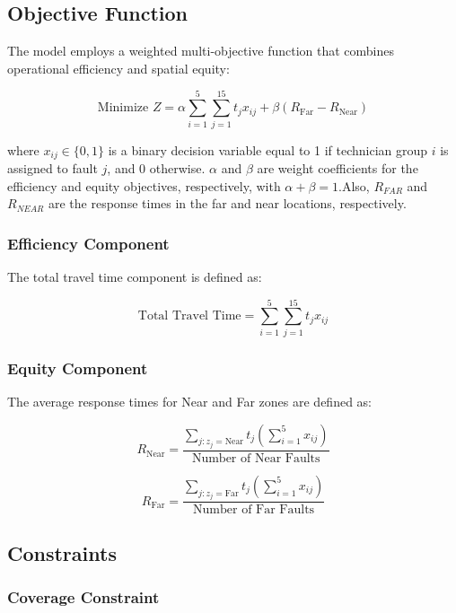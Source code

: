 \documentclass[11pt]{article}
\begin{document}
\subsection*{Objective Function}
The model employs a weighted multi-objective function that combines operational efficiency and spatial equity:

\begin{equation}
\text{Minimize } Z = \alpha \sum_{i=1}^{5} \sum_{j=1}^{15} t_j x_{ij} + \beta \left( R_{\text{Far}} - R_{\text{Near}} \right)
\end{equation}

where $x_{ij} \in \{0,1\}$ is a binary decision variable equal to 1 if technician group $i$ is assigned to fault $j$, and 0 otherwise. $\alpha$ and $\beta$ are weight coefficients for the efficiency and equity objectives, respectively, with $\alpha + \beta = 1$.Also, $R_{FAR} $ and $R_{NEAR}$ are the response times in the far and near locations, respectively.

\subsubsection*{Efficiency Component}

The total travel time component is defined as:

\begin{equation}
\text{Total Travel Time} = \sum_{i=1}^{5} \sum_{j=1}^{15} t_j x_{ij}
\end{equation}

\subsubsection*{Equity Component}

The average response times for Near and Far zones are defined as:

\begin{equation}
R_{\text{Near}} = \frac{\sum_{j: z_j = \text{Near}} t_j (\sum_{i=1}^{5} x_{ij})}{\text{Number of Near Faults}}
\end{equation}

\begin{equation}
R_{\text{Far}} = \frac{\sum_{j: z_j = \text{Far}}  t_j(\sum_{i=1}^{5}  x_{ij})}{\text{Number of Far Faults}}
\end{equation}
\subsection*{Constraints}
\subsubsection*{Coverage Constraint}
\end{document}
